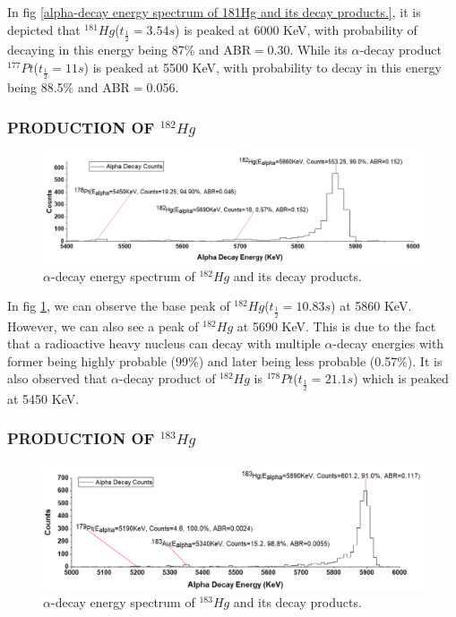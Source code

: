 \documentclass[12pt]{article}
\begin{document}
In fig \ref{alpha-decay energy spectrum of 181Hg and its decay products.}, it is depicted that $^{181}Hg$($t_\frac{1}{2}=3.54s$) is peaked at 6000 KeV, with probability of decaying in this energy being 87\% and ABR$=$0.30. While its $\alpha$-decay product $^{177}Pt$($t_\frac{1}{2}=11s$) is peaked at 5500 KeV, with probability to decay in this energy being 88.5\% and ABR$=$0.056.   


\subsubsection{PRODUCTION OF $^{182}Hg$}
\begin{figure}[h]
\centering
\includegraphics[scale=0.49]{Hg182.png}
\caption{$\alpha$-decay energy spectrum of $^{182}Hg$ and its decay products.}
\label{alpha-decay energy spectrum of 182Hg and its decay products.}
\end{figure}

In fig \ref{alpha-decay energy spectrum of 182Hg and its decay products.}, we can observe the base peak of $^{182}Hg$($t_\frac{1}{2}=10.83s$) at 5860 KeV. However, we can also see a peak of $^{182}Hg$ at 5690 KeV. This is due to the fact that a radioactive heavy nucleus can decay with multiple $\alpha$-decay energies with former being highly probable (99\%) and later being less probable (0.57\%). It is also observed that $\alpha$-decay product of $^{182}Hg$ is $^{178}Pt$($t_\frac{1}{2}=21.1s$) which is peaked at 5450 KeV.

\subsubsection{PRODUCTION OF $^{183}Hg$}
\begin{figure}[h]
\centering
\includegraphics[scale=0.49]{Hg183.png}
\caption{$\alpha$-decay energy spectrum of $^{183}Hg$ and its decay products.}
\label{alpha-decay energy spectrum of 183Hg and its decay products.}
\end{figure}
\end{document}
